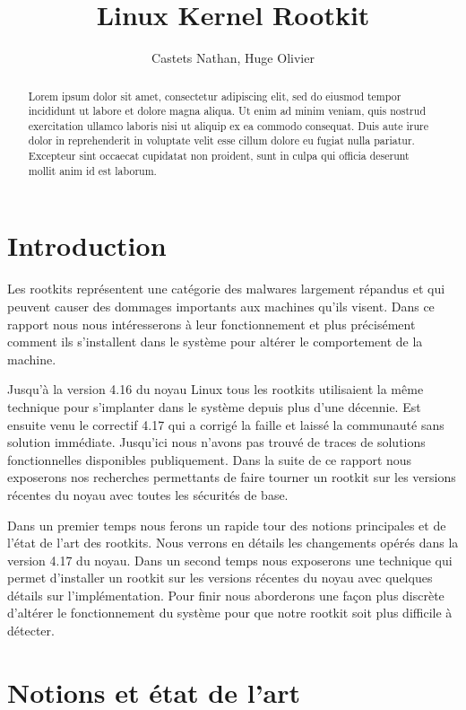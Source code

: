 \documentclass[journal, a4paper]{IEEEtran}
\begin{document}
	\title{Linux Kernel Rootkit}
	\author{Castets Nathan, Huge Olivier}
	\maketitle

\begin{abstract}
Lorem ipsum dolor sit amet, consectetur adipiscing elit, sed do eiusmod tempor incididunt ut labore et dolore magna aliqua. Ut enim ad minim veniam, quis nostrud exercitation ullamco laboris nisi ut aliquip ex ea commodo consequat. Duis aute irure dolor in reprehenderit in voluptate velit esse cillum dolore eu fugiat nulla pariatur. Excepteur sint occaecat cupidatat non proident, sunt in culpa qui officia deserunt mollit anim id est laborum.
\end{abstract}

\section{Introduction}

Les rootkits représentent une catégorie des malwares largement répandus et qui peuvent causer des dommages importants aux machines qu'ils visent. Dans ce rapport nous nous intéresserons à leur fonctionnement et plus précisément comment ils s'installent dans le système pour altérer le comportement de la machine.

Jusqu'à la version 4.16 du noyau Linux tous les rootkits utilisaient la même technique pour s'implanter dans le système depuis plus d'une décennie. Est ensuite venu le correctif 4.17 qui a corrigé la faille et laissé la communauté sans solution immédiate. Jusqu'ici nous n'avons pas trouvé de traces de solutions fonctionnelles disponibles publiquement. Dans la suite de ce rapport nous exposerons nos recherches permettants de faire tourner un rootkit sur les versions récentes du noyau avec toutes les sécurités de base.

Dans un premier temps nous ferons un rapide tour des notions principales et de l'état de l'art des rootkits. Nous verrons en détails les changements opérés dans la version 4.17 du noyau.
Dans un second temps nous exposerons une technique qui permet d'installer un rootkit sur les versions récentes du noyau avec quelques détails sur l'implémentation.
Pour finir nous aborderons une façon plus discrète d'altérer le fonctionnement du système pour que notre rootkit soit plus difficile à détecter.

\section{Notions et état de l'art}
\end{document}
